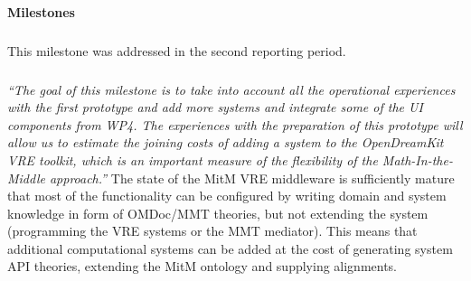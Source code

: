 \paragraph{Milestones}

\subparagraph{}
This milestone was addressed in the second reporting period.
\medskip
%

\subparagraph{}
\emph{“The goal of this milestone is to take into account all the operational experiences with the first prototype and add more systems and integrate some of the UI components from WP4.
  The experiences with the preparation of this prototype will allow us to estimate the joining costs of adding a system to the OpenDreamKit VRE toolkit, which is an important measure of the flexibility of the Math-In-the-Middle approach.”}
The state of the MitM VRE middleware is sufficiently mature that most of the functionality can be configured by writing domain and system knowledge in form of OMDoc/MMT theories, but not extending the system (programming the VRE systems or the MMT mediator).
This means that additional computational systems can be added at the cost of generating system API theories, extending the  MitM ontology and supplying alignments.

